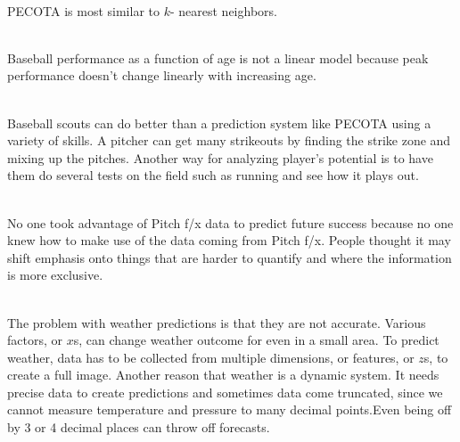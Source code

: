 \documentclass[12pt]{article}
\begin{document}

\begin{enumerate}

 \\ PECOTA is most similar to $k$- nearest neighbors.

 \\ Baseball performance as a function of age is not a linear model because peak performance doesn't change linearly with increasing age. 

 \\ Baseball scouts can do better than a prediction system like PECOTA using a variety of skills. A pitcher can get many strikeouts by finding the strike zone and mixing up the pitches. Another way for analyzing player's potential is to have them do several tests on the field such as running and see how it plays out. 

 \\
No one took advantage of Pitch f/x data to predict future success because no one knew how to make use of the data coming from Pitch f/x. People thought it may shift emphasis onto things that are harder to quantify and where the information is more exclusive. 

 \\ The problem with weather predictions is that they are not accurate. Various factors, or $x$s, can change weather outcome for even in a small area. To predict weather, data has to be collected from multiple dimensions, or features, or $z$s, to create a full image. Another reason that weather is a dynamic system. It needs precise data to create predictions and sometimes data come truncated, since we cannot measure temperature and pressure to many decimal points.Even being off by 3 or 4 decimal places can throw off forecasts. 


\end{enumerate}
\end{document}
